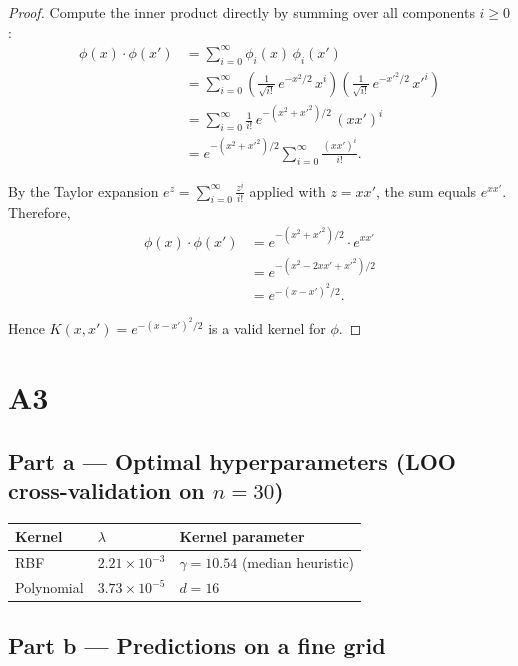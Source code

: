 \documentclass{article}
\begin{document}
\begin{proof}
Compute the inner product directly by summing over all components $i \ge 0$:
\begin{align*}
  \phi(x)\cdot\phi(x')
  &= \sum_{i=0}^{\infty} \phi_i(x)\,\phi_i(x') \\
  &= \sum_{i=0}^{\infty}
       \left(\frac{1}{\sqrt{i!}}\,e^{-x^2/2}\,x^i\right)
       \left(\frac{1}{\sqrt{i!}}\,e^{-x'^2/2}\,x'^i\right) \\
  &= \sum_{i=0}^{\infty} \frac{1}{i!}\,e^{-(x^2+x'^2)/2}\,(xx')^i \\
  &= e^{-(x^2+x'^2)/2} \sum_{i=0}^{\infty} \frac{(xx')^i}{i!}.
\end{align*}

By the Taylor expansion $e^z = \displaystyle\sum_{i=0}^{\infty}\frac{z^i}{i!}$
applied with $z = xx'$, the sum equals $e^{xx'}$.  Therefore,
\begin{align*}
  \phi(x)\cdot\phi(x')
  &= e^{-(x^2+x'^2)/2}\cdot e^{xx'} \\
  &= e^{-(x^2 - 2xx' + x'^2)/2} \\
  &= e^{-(x-x')^2/2}.
\end{align*}

Hence $K(x,x') = e^{-(x-x')^2/2}$ is a valid kernel for $\phi$.
\end{proof}

\section*{A3}

\subsection*{Part a — Optimal hyperparameters (LOO cross-validation on $n=30$)}

\begin{center}
\begin{tabular}{lll}
\toprule
Kernel & $\lambda$ & Kernel parameter \\
\midrule
RBF      & $2.21 \times 10^{-3}$ & $\gamma = 10.54$ (median heuristic) \\
Polynomial & $3.73 \times 10^{-5}$ & $d = 16$ \\
\bottomrule
\end{tabular}
\end{center}

\subsection*{Part b — Predictions on a fine grid}
\end{document}
